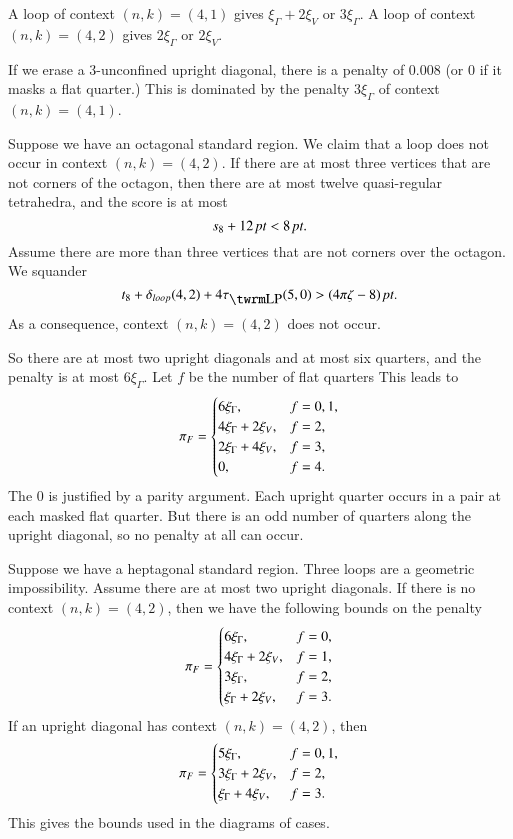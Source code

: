 A loop of context $(n,k)=(4,1)$ gives $\xi_\Gamma+2\xi_V$ or
$3\xi_\Gamma$.  A loop of context $(n,k)=(4,2)$ gives
$2\xi_\Gamma$ or $2\xi_V$.

If we erase a $3$-unconfined upright diagonal, there is a penalty
of $0.008$ (or 0 if it masks a flat quarter.) This is dominated by
the penalty $3\xi_\Gamma$ of context $(n,k)=(4,1)$.

Suppose we have an octagonal standard region.  We claim that a loop
does not occur in context $(n,k)=(4,2)$. If there are at most three
vertices that are not corners of the octagon, then there are at most
twelve quasi-regular tetrahedra, and the score is at most
$$s_8 + 12\,\hbox{\it pt}<8\,\hbox{\it pt}.$$
Assume there are more than three vertices that are not corners
over the octagon. We squander
$$t_8+ \dloop(4,2)+4\tlp(5,0) > \squander.$$
As a consequence, context $(n,k)=(4,2)$ does not occur.

So there are at most two upright diagonals and at most six quarters,
and the penalty is at most $6\xi_\Gamma$. Let $f$ be the number of
flat quarters This leads to
    $$
    {\pi_F} = \begin{cases} 6\xi_\Gamma, & f=0,1,\\
                   4\xi_\Gamma+2\xi_V, & f=2,\\
                    2\xi_\Gamma+4\xi_V, & f=3,\\
                    0, & f=4.
            \end{cases}
    $$
The 0 is justified by a parity argument.  Each upright quarter
occurs in a pair at each masked flat quarter.  But there is an odd
number of quarters along the upright diagonal, so no penalty at
all can occur.

Suppose we have a heptagonal standard region.  Three loops are a
geometric impossibility. Assume there are at most two upright
diagonals.
 If there is no context $(n,k)=(4,2)$,
 then we have the following bounds on the penalty
    $$
    {\pi_F} = \begin{cases} 6\xi_\Gamma, & f=0,\\
                 4\xi_\Gamma+2\xi_V, & f=1,\\
                3\xi_\Gamma, & f=2,\\
                \xi_\Gamma+2\xi_V, & f=3.
            \end{cases}
    $$
If an upright diagonal has context $(n,k)=(4,2)$, then
    $$
    {\pi_F} = \begin{cases} 5\xi_\Gamma, & f=0,1,\\
                3\xi_\Gamma + 2\xi_V, & f=2,\\
                \xi_\Gamma + 4 \xi_V, &f = 3.\\
            \end{cases}
    $$
This gives the bounds used in the diagrams of cases.



